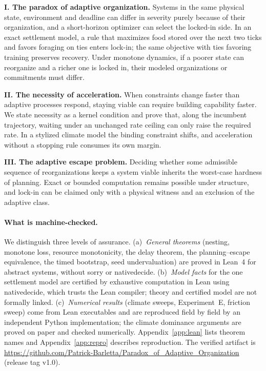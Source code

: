 \documentclass[11pt]{article}
\theoremstyle{plain}
\theoremstyle{definition}
\newcommand{\lean}[1]{{\ttfamily\renewcommand{\_}{\textunderscore\allowbreak}#1}}
\begin{document}
\textbf{I. The paradox of adaptive organization.} Systems in the same physical state, environment and deadline can differ in severity purely because of their organization, and a short-horizon optimizer can select the locked-in side. In an exact settlement model, a rule that maximizes food stored over the next two ticks and favors foraging on ties enters lock-in; the same objective with ties favoring training preserves recovery. Under monotone dynamics, if a poorer state can reorganize and a richer one is locked in, their modeled organizations or commitments must differ.

\textbf{II. The necessity of acceleration.} When constraints change faster than adaptive processes respond, staying viable can require building capability faster. We state necessity as a kernel condition and prove that, along the incumbent trajectory, waiting under an unchanged rate ceiling can only raise the required rate. In a stylized climate model the binding constraint shifts, and acceleration without a stopping rule consumes its own margin.

\textbf{III. The adaptive escape problem.} Deciding whether some admissible sequence of reorganizations keeps a system viable inherits the worst-case hardness of planning. Exact or bounded computation remains possible under structure, and lock-in can be claimed only with a physical witness and an exclusion of the adaptive class.

\paragraph{What is machine-checked.} We distinguish three levels of assurance. (a)~\emph{General theorems} (nesting, monotone loss, resource monotonicity, the delay theorem, the planning--escape equivalence, the timed bootstrap, seed undervaluation) are proved in Lean~4 for abstract systems, without \lean{sorry} or \lean{native\_decide}. (b)~\emph{Model facts} for the one settlement model are certified by exhaustive computation in Lean using \lean{native\_decide}, which trusts the Lean compiler; theory and certified model are not formally linked. (c)~\emph{Numerical results} (climate sweeps, Experiment~E, friction sweep) come from Lean executables and are reproduced field by field by an independent Python implementation; the climate dominance arguments are proved on paper and checked numerically. Appendix~\ref{app:lean} lists theorem names and Appendix~\ref{app:repro} describes reproduction. The verified artifact is \url{https://github.com/Patrick-Barletta/Paradox_of_Adaptive_Organization} (release tag v1.0).
\end{document}
